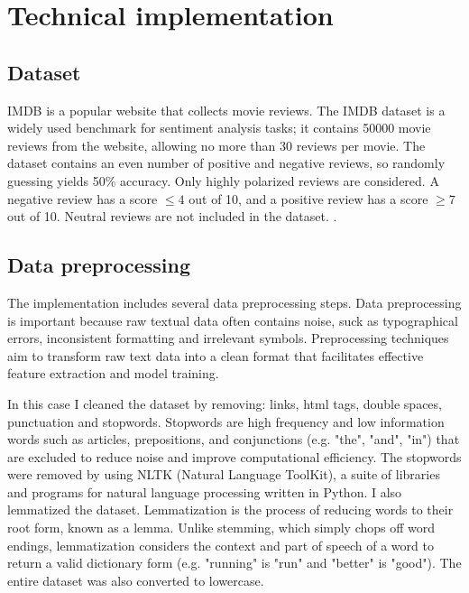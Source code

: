 \documentclass{article}
\begin{document}
\section{Technical implementation}

\subsection{Dataset}
IMDB is a popular website that collects movie reviews.
The IMDB dataset is a widely used benchmark for sentiment analysis tasks;
it contains 50000 movie reviews from the website, allowing no more than 30 reviews per movie.
The dataset contains an even number of positive and negative reviews, so randomly guessing yields 50\% accuracy.
Only highly polarized reviews are considered.
A negative review has a score $\leq 4$ out of 10, and a positive review has a score $\geq 7$ out of 10. Neutral reviews are not included in the dataset. \cite{imdb_dataset_stanfordnlp}. 

\subsection{Data preprocessing}

The implementation includes several data preprocessing steps.
Data preprocessing is important because raw textual data often contains noise, suck as typographical errors, inconsistent formatting and irrelevant symbols.
Preprocessing techniques aim to transform raw text data into a clean format that facilitates effective feature extraction and model training.

In this case I cleaned the dataset by removing: links, html tags, double spaces, punctuation and stopwords.
Stopwords are high frequency and low information words such as articles, prepositions, and conjunctions (e.g. "the", "and", "in") that are excluded to reduce noise and improve computational efficiency.
The stopwords were removed by using NLTK (Natural Language ToolKit), a suite of libraries and programs for natural language processing written in Python.
I also lemmatized the dataset.
Lemmatization is the process of reducing words to their root form, known as a lemma.
Unlike stemming, which simply chops off word endings, lemmatization considers the context and part of speech of a word to return a valid dictionary form (e.g. "running" is "run" and "better" is "good").
The entire dataset was also converted to lowercase.
\end{document}
